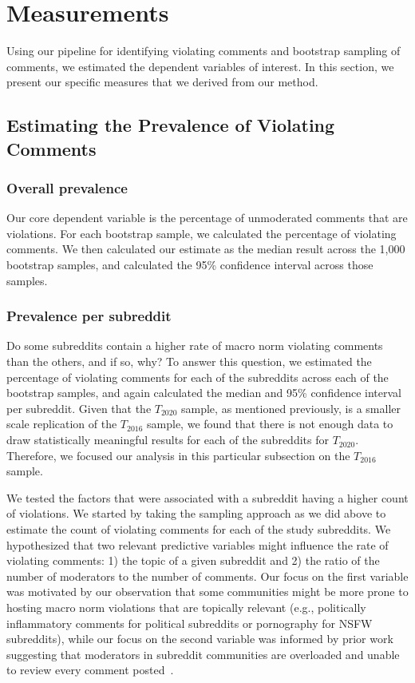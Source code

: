 \section{Measurements}
Using our pipeline for identifying violating comments and bootstrap sampling of comments, we estimated the dependent variables of interest. In this section, we present our specific measures that we derived from our method. 


\subsection{Estimating the Prevalence of Violating Comments}

\subsubsection{Overall prevalence} 
Our core dependent variable is the percentage of unmoderated comments that are  violations. For each bootstrap sample, we calculated the percentage of violating comments. We then calculated our estimate as the median result across the 1,000 bootstrap samples, and calculated the 95\% confidence interval across those samples. 

\subsubsection{Prevalence per subreddit} 
Do some subreddits contain a higher rate of macro norm violating comments than the others, and if so, why? To answer this question, we estimated the percentage of violating comments for each of the subreddits across each of the bootstrap samples, and again calculated the median and 95\% confidence interval per subreddit. Given that the $T_{2020}$ sample, as mentioned previously, is a smaller scale replication of the $T_{2016}$ sample, we found that there is not enough data to draw statistically meaningful results for each of the subreddits for $T_{2020}$. Therefore, we focused our analysis in this particular subsection on the $T_{2016}$ sample. 

We tested the factors that were associated with a subreddit having a higher count of violations. We started by taking the sampling approach as we did above to estimate the count of violating comments for each of the study subreddits. We hypothesized that two relevant predictive variables might influence the rate of violating comments: 1) the topic of a given subreddit and 2) the ratio of the number of moderators to the number of comments. Our focus on the first variable was motivated by our observation that some communities might be more prone to hosting macro norm violations that are topically relevant (e.g., politically inflammatory comments for political subreddits or pornography for NSFW subreddits), while our focus on the second variable was informed by prior work suggesting that moderators in subreddit communities are overloaded and unable to review every comment posted~\cite{Chandrasekharan2018internet, 18_Gilbert}.

